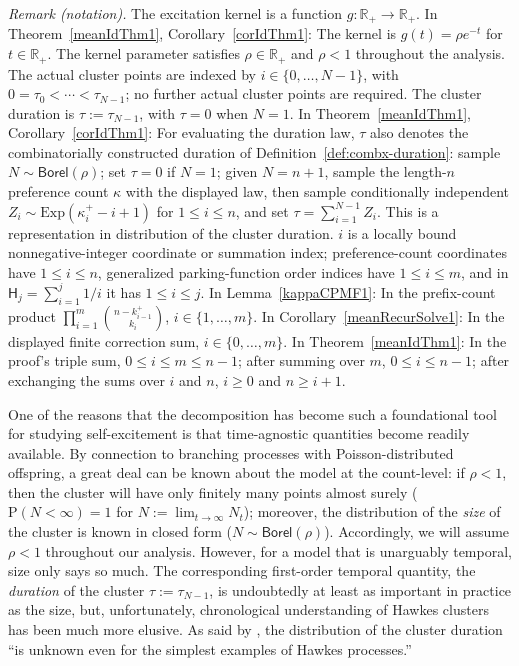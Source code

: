 \documentclass[opre,nonblindrev]{informs3_no_remark}
\newcommand{\PP}[1]{\mathrm{P}\left( #1 \right)}
\begin{document}
\noindent\textit{Remark (notation).} The excitation kernel is a function $g:\mathbb{R}_+\to\mathbb{R}_+$. In Theorem~\ref{meanIdThm1}, Corollary~\ref{corIdThm1}: The kernel is $g(t)=\rho e^{-t}$ for $t\in\mathbb{R}_+$. The kernel parameter satisfies $\rho\in\mathbb{R}_+$ and $\rho<1$ throughout the analysis. The actual cluster points are indexed by $i\in\{0,\dots,N-1\}$, with $0=\tau_0<\cdots<\tau_{N-1}$; no further actual cluster points are required. The cluster duration is $\tau:=\tau_{N-1}$, with $\tau=0$ when $N=1$. In Theorem~\ref{meanIdThm1}, Corollary~\ref{corIdThm1}: For evaluating the duration law, $\tau$ also denotes the combinatorially constructed duration of Definition~\ref{def:combx-duration}: sample $N\sim\mathsf{Borel}(\rho)$; set $\tau=0$ if $N=1$; given $N=n+1$, sample the length-$n$ preference count $\kappa$ with the displayed law, then sample conditionally independent $Z_i\sim\mathrm{Exp}(\kappa_i^+-i+1)$ for $1\leq i\leq n$, and set $\tau=\sum_{i=1}^{N-1}Z_i$. This is a representation in distribution of the cluster duration. $i$ is a locally bound nonnegative-integer coordinate or summation index; preference-count coordinates have $1\leq i\leq n$, generalized parking-function order indices have $1\leq i\leq m$, and in $\mathsf{H}_j=\sum_{i=1}^j1/i$ it has $1\leq i\leq j$. In Lemma~\ref{kappaCPMF1}: In the prefix-count product $\prod_{i=1}^m {n-k_{i-1}^+\choose k_i}$, $i\in\{1,\dots,m\}$. In Corollary~\ref{meanRecurSolve1}: In the displayed finite correction sum, $i\in\{0,\dots,m\}$. In Theorem~\ref{meanIdThm1}: In the proof's triple sum, $0\leq i\leq m\leq n-1$; after summing over $m$, $0\leq i\leq n-1$; after exchanging the sums over $i$ and $n$, $i\geq0$ and $n\geq i+1$.



One of the reasons that the \citet{hawkes1974cluster} decomposition has become such a foundational tool for studying self-excitement is that time-agnostic quantities become readily available. By connection to branching processes with Poisson-distributed offspring, a great deal can be known about the model at the count-level: if $\rho < 1$, then the cluster will have only finitely many points almost surely ($\PP{N < \infty} = 1$ for $N := \lim_{t \to \infty} N_t$); moreover, the distribution of the \emph{size} of the cluster is known in closed form ($N \sim \mathsf{Borel}(\rho)$). 
Accordingly, we will assume $\rho < 1$ throughout our analysis.
However, for a model that is unarguably temporal, size only says so much. The corresponding first-order temporal quantity, the \emph{duration} of the cluster $\tau := \tau_{N-1}$, is undoubtedly at least as important in practice as the size, but, unfortunately, chronological understanding of Hawkes clusters has been much more elusive. As said by \citet[][pg.~631]{moller2005perfect}, the distribution of the cluster duration ``is unknown even for the simplest examples of Hawkes processes.''
\end{document}
